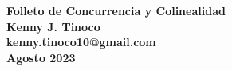 \begin{center}
    \textbf
    {
            {\LARGE Folleto de Concurrencia y Colinealidad}\\\vspace{4mm}
    Kenny J. Tinoco\\\vspace{1mm}
    kenny.tinoco10@gmail.com\\\vspace{1mm}
    Agosto 2023
    }
\end{center}

\thispagestyle{first-page-style}

\tableofcontents